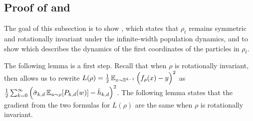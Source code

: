 \subsection{Proof of  and } \label{subsec:pop_symmetry_missing_proofs}

The goal of this subsection is to show , which states that $\rho_t$ remains symmetric and rotationally invariant under the infinite-width population dynamics, and to show  which describes the dynamics of the first coordinates of the particles in $\rho_t$.

The following lemma is a first step. Recall that when $\rho$ is rotationally invariant, then  allows us to rewrite $L(\rho) = \frac{1}{2} \operatorname*{\mathbb{E}}_{x \sim \mathbb{S}^{d - 1}} \Big(f_\rho(x) - y \Big)^2$ as $\frac{1}{2} \sum_{k = 0}^\infty \Big(\hat{\sigma}_{k, d} \operatorname*{\mathbb{E}}_{u \sim \rho} [{P_{k, d}}(w)] - \hat{h}_{k, d} \Big)^2$. The following lemma states that the gradient from the two formulas for $L(\rho)$ are the same when $\rho$ is rotationally invariant.


